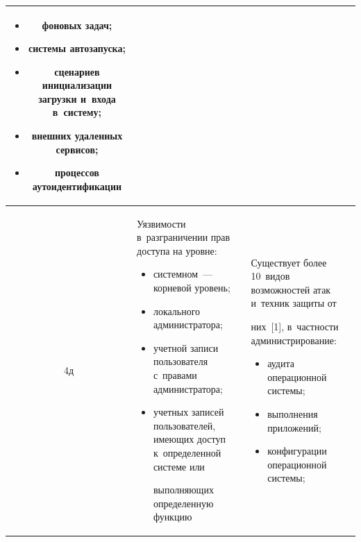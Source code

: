 \begin{table}
\begin{center}
\begin{tabular}{|c|p{58mm}|p{58mm}|}
\begin{itemize}
\item фоновых задач;

\item системы автозапуска;

\item сценариев инициализации загрузки и~входа в~систему;

\item внешних удаленных сервисов;

\item процессов аутоидентификации\vspace*{-6pt}

\end{itemize}\\

\hline

4д&Уязвимости в~разграничении прав доступа на уровне:\vspace*{-6pt}

\begin{itemize}

\addtolength{\itemsep}{-6pt}

\item системном~--- корневой уровень;

\item локального администратора;

\item учетной записи пользователя с~правами администратора;

\item учетных записей пользователей, имеющих доступ к~определенной сис\-те\-ме или 

выполняющих определенную функцию\vspace*{-6pt}

\end{itemize}&Существует более 10~видов возможностей атак и~техник защиты от 

них~[1], в~частности администрирование:\vspace*{-6pt}

\begin{itemize}

\addtolength{\itemsep}{-6pt}

\item аудита операционной сис\-темы;    

\item выполнения приложений;    

\item конфигурации операционной сис\-темы;    


\end{itemize}
\end{tabular}
\end{center}
\end{table}
